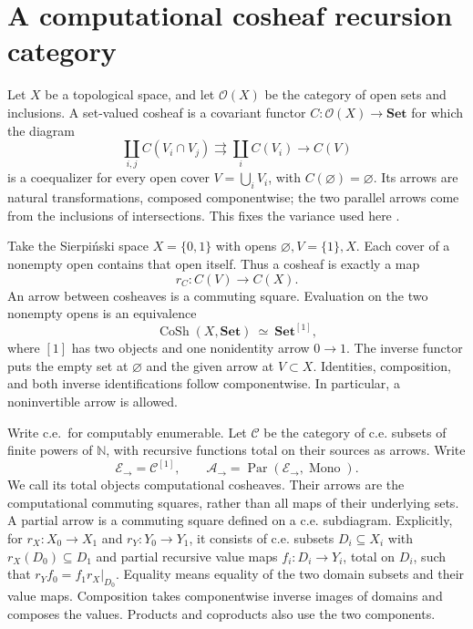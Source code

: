 \documentclass[11pt]{article}
\theoremstyle{definition}\newtheorem{definition}[theorem]{Definition}
\theoremstyle{remark}\newtheorem{remark}[theorem]{Remark}
\newcommand{\A}{\mathscr A}
\newcommand{\E}{\mathscr E}
\newcommand{\N}{\mathbb N}
\newcommand{\Par}{\operatorname{Par}}
\newcommand{\Set}{\mathbf{Set}}
\newcommand{\Mono}{\operatorname{Mono}}
\begin{document}
\section{A computational cosheaf recursion category}\label{sec:cosheaves}

Let \(X\) be a topological space, and let \(\mathcal O(X)\) be the
category of open sets and inclusions. A set-valued cosheaf is a
covariant functor \(C:\mathcal O(X)\to\Set\) for which the diagram
\[
 \coprod_{i,j}C(V_i\cap V_j)
 \rightrightarrows\coprod_i C(V_i)\longrightarrow C(V)
\]
is a coequalizer for every open cover \(V=\bigcup_iV_i\), with
\(C(\varnothing)=\varnothing\). Its arrows are natural
transformations, composed componentwise; the two parallel arrows
come from the inclusions of intersections.
This fixes the variance used here \cite[\S\S2.1--2.2]{Curry}.

Take the Sierpi\'nski space \(X=\{0,1\}\) with opens
\(\varnothing,V=\{1\},X\). Each cover of a nonempty open contains
that open itself. Thus a cosheaf is exactly a map
\[
 r_C:C(V)\longrightarrow C(X).
\]
An arrow between cosheaves is a commuting square. Evaluation on
the two nonempty opens is an equivalence
\[
 \operatorname{CoSh}(X,\Set)\ \simeq\ \Set^{[1]},
\]
where \([1]\) has two objects and one nonidentity arrow \(0\to1\).
The inverse functor puts the empty set at \(\varnothing\) and
the given arrow at \(V\subset X\). Identities, composition, and
both inverse identifications follow componentwise. In particular,
a noninvertible arrow is allowed.

Write c.e.\ for computably enumerable.
Let \(\mathscr C\) be the category of c.e. subsets of finite powers
of \(\N\), with recursive functions total on their sources as
arrows. Write
\[
 \E_\to=\mathscr C^{[1]},\qquad
 \A_\to=\Par(\E_\to,\Mono).
\]
We call its total objects computational cosheaves. Their arrows
are the computational commuting squares, rather than all maps of
their underlying sets. A partial arrow is a commuting square
defined on a c.e. subdiagram. Explicitly, for
\(r_X:X_0\to X_1\) and \(r_Y:Y_0\to Y_1\), it consists of c.e.
subsets \(D_i\subseteq X_i\) with \(r_X(D_0)\subseteq D_1\) and
partial recursive value maps \(f_i:D_i\to Y_i\), total on \(D_i\),
such that \(r_Yf_0=f_1r_X|_{D_0}\). Equality means equality of
the two domain subsets and their value maps. Composition takes
componentwise inverse images of domains and composes the values.
Products and coproducts also use the two components.
\end{document}
